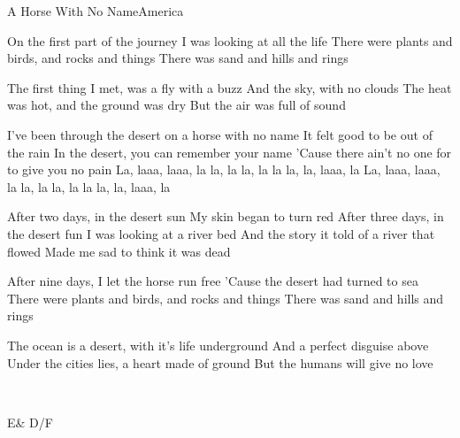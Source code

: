 \begin{Song}{A Horse With No Name}{America}

\begin{Verse}
On the first part of the journey
I was looking at all the life
There were plants and birds, and rocks and things
There was sand and hills and rings
\espaceInterStrophe

The first thing I met, was a fly with a buzz
And the sky, with no clouds
The heat was hot, and the ground was dry
But the air was full of sound
\end{Verse}
\espaceInterStrophe

\begin{Chorus}
I've been through the desert on a horse with no name
It felt good to be out of the rain
In the desert, you can remember your name
'Cause there ain't no one for to give you no pain
La, laaa, laaa, la la, la la, la la la, la, laaa, la
La, laaa, laaa, la la, la la, la la la, la, laaa, la
\end{Chorus}
\espaceInterStrophe

\begin{Verse}
After two days, in the desert sun
My skin began to turn red
After three days, in the desert fun
I was looking at a river bed
And the story it told of a river that flowed
Made me sad to think it was dead
\end{Verse}
\espaceInterStrophe

\tochorus
\espaceInterStrophe

\begin{Verse}
After nine days, I let the horse run free
'Cause the desert had turned to sea
There were plants and birds, and rocks and things
There was sand and hills and rings
\espaceInterStrophe

The ocean is a desert, with it's life underground
And a perfect disguise above
Under the cities lies, a heart made of ground
But the humans will give no love
\end{Verse}
\espaceInterStrophe

\tochorus\\
\adlib

\vfill


\begin{Chords}
\hline
E\mineur & D/F\diese\\\hline
\end{Chords}


\vfill

\end{Song}


